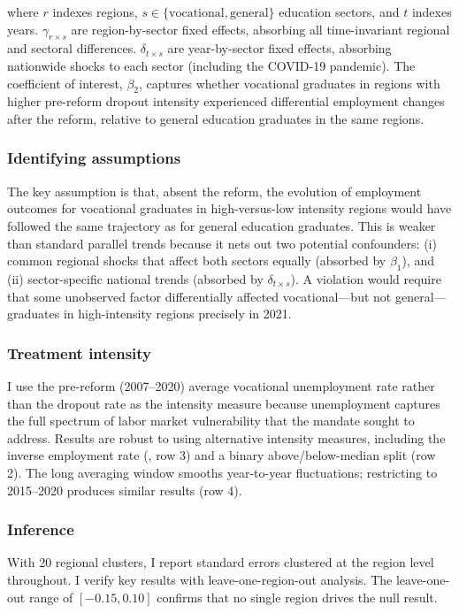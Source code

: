 \documentclass[12pt]{article}
\begin{document}
where $r$ indexes regions, $s \in \{\text{vocational}, \text{general}\}$ education sectors, and $t$ indexes years. $\gamma_{r \times s}$ are region-by-sector fixed effects, absorbing all time-invariant regional and sectoral differences. $\delta_{t \times s}$ are year-by-sector fixed effects, absorbing nationwide shocks to each sector (including the COVID-19 pandemic). The coefficient of interest, $\beta_2$, captures whether vocational graduates in regions with higher pre-reform dropout intensity experienced differential employment changes after the reform, relative to general education graduates in the same regions.

\subsubsection*{Identifying assumptions} The key assumption is that, absent the reform, the evolution of employment outcomes for vocational graduates in high-versus-low intensity regions would have followed the same trajectory as for general education graduates. This is weaker than standard parallel trends because it nets out two potential confounders: (i) common regional shocks that affect both sectors equally (absorbed by $\beta_1$), and (ii) sector-specific national trends (absorbed by $\delta_{t \times s}$). A violation would require that some unobserved factor differentially affected vocational---but not general---graduates in high-intensity regions precisely in 2021.

\subsubsection*{Treatment intensity} I use the pre-reform (2007--2020) average vocational unemployment rate rather than the dropout rate as the intensity measure because unemployment captures the full spectrum of labor market vulnerability that the mandate sought to address. Results are robust to using alternative intensity measures, including the inverse employment rate (, row 3) and a binary above/below-median split (row 2). The long averaging window smooths year-to-year fluctuations; restricting to 2015--2020 produces similar results (row 4).

\subsubsection*{Inference} With 20 regional clusters, I report standard errors clustered at the region level throughout. I verify key results with leave-one-region-out analysis. The leave-one-out range of $[-0.15, 0.10]$ confirms that no single region drives the null result.
\end{document}
